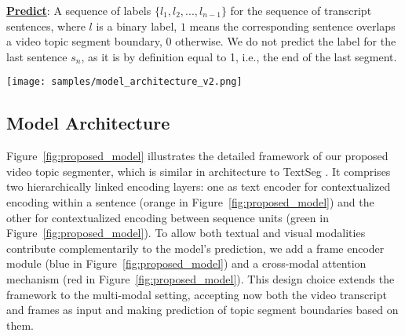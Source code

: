 \documentclass[runningheads]{llncs}
\begin{document}
\vspace{1ex}
\noindent
\textbf{\underline{Predict}}: A sequence of labels $\{ l_1, l_2, ... , l_{n-1} \}$ for the sequence of transcript sentences, where $l$ is a binary label, $1$ means the corresponding sentence overlaps a video topic segment boundary, %
$0$ otherwise. We do not predict the label for the last sentence $s_n$, as it is by definition equal to 1, i.e., the end of the last segment.

\begin{figure*}
\setlength{\belowcaptionskip}{-10pt}
    \centering
    \texttt{[image: samples/model\_architecture\_v2.png]}
    \caption{\textbf{Left}: The overall architecture of our proposed multi-modal video topic segmentation model, with four sub-modules (in \S\ref{sec:model_details}) coded in different colors. \textbf{Right}: The detailed illustration of cross-modal attention.} %
    \label{fig:proposed_model}
\end{figure*}

\vspace{-2ex}
\subsection{Model Architecture}
\label{sec:model_details}
Figure~\ref{fig:proposed_model} illustrates the detailed framework of our proposed video topic segmenter, which is similar in architecture to TextSeg \cite{koshorek-etal-2018-text}. It comprises 
two hierarchically linked encoding layers: one as text encoder for contextualized encoding within a sentence (orange in Figure~\ref{fig:proposed_model}) and the other for contextualized encoding between sequence units (green in Figure~\ref{fig:proposed_model}). To allow both textual and visual modalities contribute complementarily to the model's prediction, we add a frame encoder module (blue in Figure~\ref{fig:proposed_model}) and a cross-modal attention mechanism (red in Figure~\ref{fig:proposed_model}). This design choice extends the framework to the multi-modal setting, accepting now both the video transcript and frames as input and making prediction of topic segment boundaries based on them.
\end{document}
